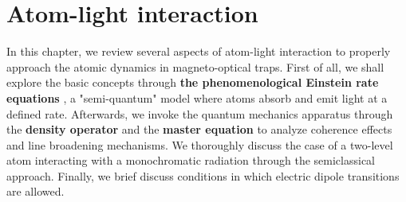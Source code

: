 %
\chapter{Atom-light interaction}
\label{ch:atom-light-interaction}
%

In this chapter, we review several aspects of atom-light interaction \cite{weiner2003light} to properly approach the atomic dynamics in magneto-optical traps. First of all, we shall explore the basic concepts through \textbf{the phenomenological Einstein rate equations} \cite{foot2005atomic}, a "semi-quantum" model where atoms absorb and emit light at a defined rate. Afterwards, we invoke the quantum mechanics apparatus through the \textbf{density operator} and the \textbf{master equation} \cite{steck2007quantum} to analyze coherence effects and line broadening mechanisms. We thoroughly discuss the case of a two-level atom interacting with a monochromatic radiation through the semiclassical approach. Finally, we brief discuss conditions in which electric dipole transitions are allowed.



%



